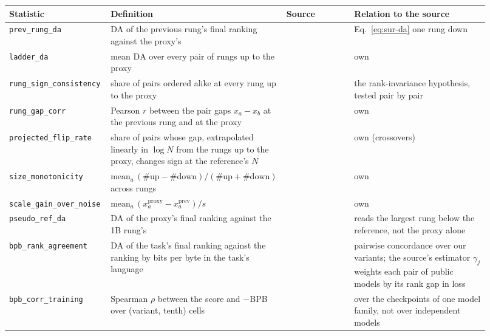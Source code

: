 \begin{table}[h]
\centering
\scriptsize
\begin{tabular}{@{}p{0.215\linewidth}p{0.28\linewidth}p{0.14\linewidth}p{0.285\linewidth}@{}}
\toprule
\textbf{Statistic} & \textbf{Definition} & \textbf{Source} & \textbf{Relation to the source} \\
\midrule
\texttt{prev\_rung\_da} & $\mathrm{DA}$ of the previous rung's final ranking against the proxy's & \citet{magnusson_datadecide_2025} & Eq.~\ref{eq:sur-da} one rung down \\
\texttt{ladder\_da} & mean $\mathrm{DA}$ over every pair of rungs up to the proxy & \citet{magnusson_datadecide_2025} & own \\
\texttt{rung\_sign\_consistency} & share of pairs ordered alike at every rung up to the proxy & \citet{liu_regmix_2025} & the rank-invariance hypothesis, tested pair by pair \\
\texttt{rung\_gap\_corr} & Pearson $r$ between the pair gaps $x_a - x_b$ at the previous rung and at the proxy & \citet{liu_regmix_2025} & own \\
\texttt{projected\_flip\_rate} & share of pairs whose gap, extrapolated linearly in $\log N$ from the rungs up to the proxy, changes sign at the reference's $N$ & \citet{magnusson_datadecide_2025} & own (crossovers) \\
\texttt{size\_monotonicity} & $\mathrm{mean}_a\,(\#\text{up} - \#\text{down})/(\#\text{up} + \#\text{down})$ across rungs & \citet{bhagia_establishing_2025} & own \\
\texttt{scale\_gain\_over\_noise} & $\mathrm{mean}_a\,(x_a^{\text{proxy}} - x_a^{\text{prev}})/s$ & \citet{bhagia_establishing_2025} & own \\
\texttt{pseudo\_ref\_da} & $\mathrm{DA}$ of the proxy's final ranking against the 1B rung's & \citet{magnusson_datadecide_2025, liu_regmix_2025} & reads the largest rung below the reference, not the proxy alone \\
\midrule
\texttt{bpb\_rank\_agreement} & $\mathrm{DA}$ of the task's final ranking against the ranking by bits per byte in the task's language & \citet{thrush_improving_2025} & pairwise concordance over our variants; the source's estimator $\gamma_j$ weights each pair of public models by its rank gap in loss \\
\texttt{bpb\_corr\_training} & Spearman $\rho$ between the score and $-$BPB over (variant, tenth) cells & \citet{thrush_improving_2025, brandfonbrener_loss--loss_2024} & over the checkpoints of one model family, not over independent models \\

\end{tabular}
\end{table}
